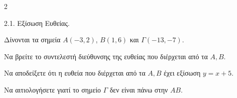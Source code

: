 \begin{ylh}{2}
    \item 2.1. Εξίσωση Ευθείας.
\end{ylh}
Δίνονται τα σημεία $A(-3, 2)$, $B(1, 6)$ και $\Gamma(-13, -7)$.
\begin{alist}
\item Να βρείτε το συντελεστή διεύθυνσης της ευθείας που διέρχεται από τα $A, B$. 
\item Να αποδείξετε ότι η ευθεία που διέρχεται από τα $A, B$ έχει εξίσωση $y=x+5$. 
\item Να αιτιολογήσετε γιατί το σημείο $\Gamma$ δεν είναι πάνω στην $AB$. 
\end{alist}